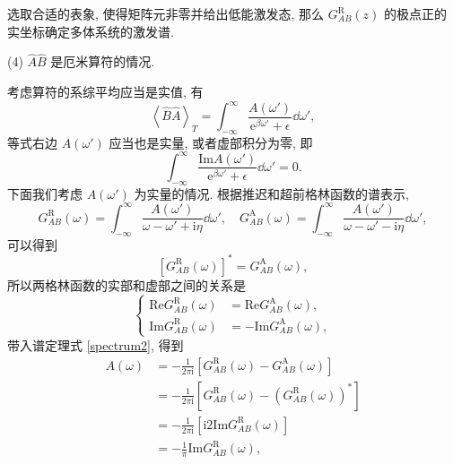 选取合适的表象, 使得矩阵元非零并给出低能激发态, 那么 $G_{AB}^{\mathrm{R}}(z)$ 的极点正的实坐标确定多体系统的激发谱.
   
    (4)  $\hat{A}\hat{B}$ 是厄米算符的情况.
     
    考虑算符的系综平均应当是实值, 有
    \begin{equation}
        \left\langle \hat{B}\hat{A} \right\rangle_T=\int_{-\infty}^{\infty}\frac{A(\omega')}{\mathrm{e}^{\beta \omega'}+\epsilon}\dd\omega',
    \end{equation} 
    等式右边 $A(\omega')$ 应当也是实量, 或者虚部积分为零, 即
    \begin{equation}
        \int_{-\infty}^{\infty}\frac{\mathrm{Im}A(\omega')}{\mathrm{e}^{\beta\omega'}+\epsilon}\dd \omega'=0.
    \end{equation}
    下面我们考虑 $A(\omega')$ 为实量的情况. 根据推迟和超前格林函数的谱表示,
    \begin{equation}
        G_{AB}^{\mathrm{R}}(\omega)=\int_{-\infty}^{\infty}\frac{A(\omega')}{\omega-\omega'+\mathrm{i}\eta}\dd\omega',\quad G_{AB}^{\mathrm{A}}(\omega)=\int_{-\infty}^{\infty}\frac{A(\omega')}{\omega-\omega'-\mathrm{i}\eta}\dd\omega',
    \end{equation}
    可以得到
    \begin{equation}
        \left[ G_{AB}^{\mathrm{R}}(\omega) \right]^*=G_{AB}^{\mathrm{A}}(\omega),
    \end{equation}
    所以两格林函数的实部和虚部之间的关系是
    \begin{equation}
        \left\{
            \begin{aligned}
                \mathrm{Re}G_{AB}^{\mathrm{R}}(\omega)&=\mathrm{Re}G_{AB}^{\mathrm{A}}(\omega),\\
                \mathrm{Im}G_{AB}^{\mathrm{R}}(\omega)&=-\mathrm{Im}G_{AB}^{\mathrm{A}}(\omega),
            \end{aligned}
        \right.
    \end{equation}
    带入谱定理式 \eqref{spectrum2}, 得到
   \begin{align}
            A(\omega)&=-\frac{1}{2\pi \mathrm{i}}\left[ G_{AB}^{\mathrm{R}}(\omega)-G_{AB}^{\mathrm{A}}(\omega) \right]\nonumber\\
            &=-\frac{1}{2\pi\mathrm{i}}\left[ G_{AB}^{\mathrm{R}}(\omega)-\left( G_{AB}^{\mathrm{R}}(\omega) \right)^* \right]\nonumber\\
            &=-\frac{1}{2\pi\mathrm{i}}\left[ \mathrm{i} 2\mathrm{Im}G_{AB}^{\mathrm{R}}(\omega) \right]\nonumber\\
            &=-\frac{1}{\pi}\mathrm{Im}G_{AB}^{\mathrm{R}}(\omega),
        \end{align}
